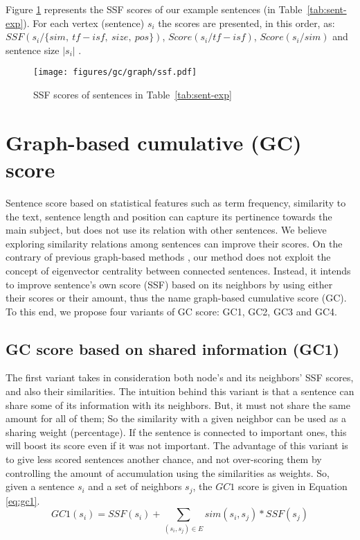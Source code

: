 Figure \ref{fig:ssf-exp} represents the SSF scores of our example sentences (in Table~\ref{tab:sent-exp}).
For each vertex (sentence) $ s_i $ the scores are presented, in this order, as: $ SSF(s_i/ \{ sim,\ tf-isf,\ size,\ pos \}) $, $ Score(s_i/ tf-isf) $, $ Score(s_i/ sim) $ and sentence size $ | s_i | $ .

\begin{figure}[ht]
	\centering
	\texttt{[image: figures/gc/graph/ssf.pdf]} %
	\caption{SSF scores of sentences in Table~\ref{tab:sent-exp}}
	\label{fig:ssf-exp}
\end{figure}


\section{Graph-based cumulative (GC) score}


Sentence score based on statistical features such as term frequency, similarity to the text, sentence length and position can capture its pertinence towards the main subject, but does not use its relation with other sentences.
We believe exploring similarity relations among sentences can improve their scores.
On the contrary of previous graph-based methods \citep{04-mihalcea-tarau,04-erkan-radev}, our method does not exploit the concept of eigenvector centrality between connected sentences. 
Instead, it intends to improve sentence's own score (SSF) based on its neighbors by using either their scores or their amount, thus the name graph-based cumulative score (GC).
To this end, we propose four variants of GC score: GC1, GC2, GC3 and GC4. 

\subsection{GC score based on shared information (GC1)}

The first variant takes in consideration both node's and its neighbors' SSF scores, and also their similarities.
The intuition behind this variant is that a sentence can share some of its information with its neighbors. 
But, it must not share the same amount for all of them; So the similarity with a given neighbor can be used as a sharing weight (percentage).
If the sentence is connected to important ones, this will boost its score even if it was not important. 
The advantage of this variant is to give less scored sentences another chance, and not over-scoring them by controlling the amount of accumulation using the similarities as weights.
So, given a sentence $ s_i $ and a set of neighbors $ s_j $, the $ GC1 $ score is given in Equation \ref{eq:gc1}.
\begin{equation}
	GC1(s_i) = SSF(s_i) + \sum\limits_{(s_i, s_j) \in E} sim(s_i, s_j) * SSF(s_j)
	\label{eq:gc1}
\end{equation}

